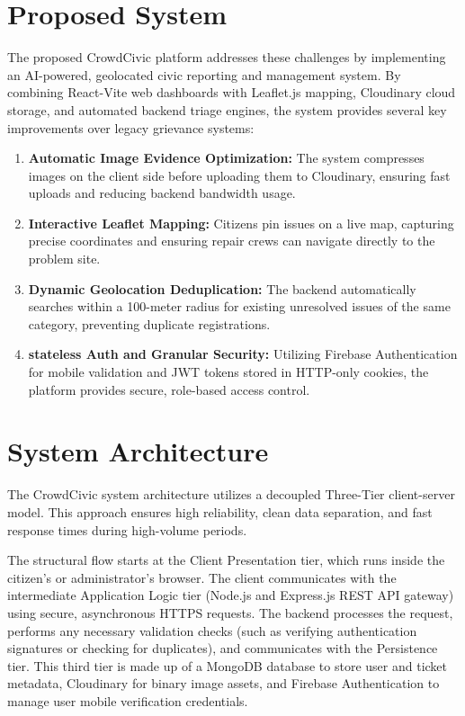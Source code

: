 \documentclass[conference]{IEEEtran}
\begin{document}
\section{Proposed System}
The proposed CrowdCivic platform addresses these challenges by implementing an AI-powered, geolocated civic reporting and management system. By combining React-Vite web dashboards with Leaflet.js mapping, Cloudinary cloud storage, and automated backend triage engines, the system provides several key improvements over legacy grievance systems:
\begin{enumerate}
    \item \textbf{Automatic Image Evidence Optimization:} The system compresses images on the client side before uploading them to Cloudinary, ensuring fast uploads and reducing backend bandwidth usage.
    \item \textbf{Interactive Leaflet Mapping:} Citizens pin issues on a live map, capturing precise coordinates and ensuring repair crews can navigate directly to the problem site.
    \item \textbf{Dynamic Geolocation Deduplication:} The backend automatically searches within a 100-meter radius for existing unresolved issues of the same category, preventing duplicate registrations.
    \item \textbf{stateless Auth and Granular Security:} Utilizing Firebase Authentication for mobile validation and JWT tokens stored in HTTP-only cookies, the platform provides secure, role-based access control.
\end{enumerate}

\section{System Architecture}
The CrowdCivic system architecture utilizes a decoupled Three-Tier client-server model. This approach ensures high reliability, clean data separation, and fast response times during high-volume periods.

The structural flow starts at the Client Presentation tier, which runs inside the citizen's or administrator's browser. The client communicates with the intermediate Application Logic tier (Node.js and Express.js REST API gateway) using secure, asynchronous HTTPS requests. The backend processes the request, performs any necessary validation checks (such as verifying authentication signatures or checking for duplicates), and communicates with the Persistence tier. This third tier is made up of a MongoDB database to store user and ticket metadata, Cloudinary for binary image assets, and Firebase Authentication to manage user mobile verification credentials.
\end{document}
